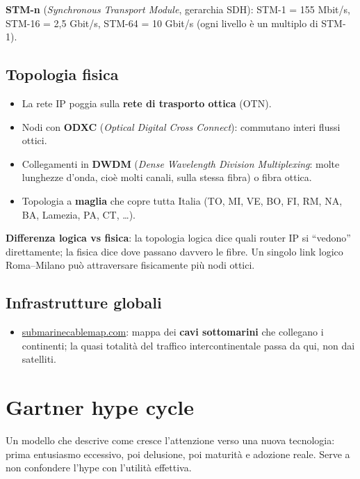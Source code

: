 \textbf{STM-n} (\emph{Synchronous Transport Module}, gerarchia SDH): STM-1 = 155 Mbit/s, STM-16 = 2,5 Gbit/s, STM-64 = 10 Gbit/s (ogni livello è un multiplo di STM-1).

\subsection{Topologia fisica}

\begin{itemize}
\tightlist
\item
  La rete IP poggia sulla \textbf{rete di trasporto ottica} (OTN).
\item
  Nodi con \textbf{ODXC} (\emph{Optical Digital Cross Connect}): commutano interi flussi ottici.
\item
  Collegamenti in \textbf{DWDM} (\emph{Dense Wavelength Division Multiplexing}: molte lunghezze d'onda, cioè molti canali, sulla stessa fibra) o fibra ottica.
\item
  Topologia a \textbf{maglia} che copre tutta Italia (TO, MI, VE, BO, FI, RM, NA, BA, Lamezia, PA, CT, \ldots).
\end{itemize}

\textbf{Differenza logica vs fisica}: la topologia logica dice quali router IP si ``vedono'' direttamente; la fisica dice dove passano davvero le fibre. Un singolo link logico Roma--Milano può attraversare fisicamente più nodi ottici.

\subsection{Infrastrutture globali}

\begin{itemize}
\tightlist
\item
  \href{http://www.submarinecablemap.com/}{submarinecablemap.com}: mappa dei \textbf{cavi sottomarini} che collegano i continenti; la quasi totalità del traffico intercontinentale passa da qui, non dai satelliti.
\end{itemize}

\section{Gartner hype cycle}

\begin{inbreve}

Un modello che descrive come cresce l'attenzione verso una nuova tecnologia: prima entusiasmo eccessivo, poi delusione, poi maturità e adozione reale. Serve a non confondere l'hype con l'utilità effettiva.

\end{inbreve}

